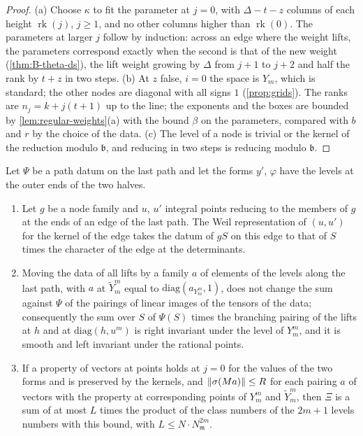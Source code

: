 \begin{proof}
(a) Choose $\kappa$ to fit the parameter at $j=0$, with $\Delta-t-z$ columns of each height $\operatorname{rk}(j)$, $j\ge1$, and no other columns higher than $\operatorname{rk}(0)$. The parameters at larger $j$ follow by induction: across an edge where
the weight lifts, the parameters correspond exactly when the second is that of the new weight (\cref{thm:B-theta-ds}), the lift weight growing by $\Delta$ from $j+1$ to $j+2$ and half the rank by $t+z$ in two steps. (b) At $z$ false,
$i=0$ the space is $Y_m$, which is standard; the other nodes are diagonal with all signs $1$ (\cref{prop:grids}). The ranks are $n_j=k+j(t+1)$ up to the line; the exponents and the boxes are bounded by \cref{lem:regular-weights}(a) with
the bound $\beta$ on the parameters, compared with $b$ and $r$ by the choice of the data. (c) The level of a node is trivial or the kernel of the reduction modulo $\mathfrak b$, and reducing in two steps is reducing modulo $\mathfrak b$.
\end{proof}

\begin{lemma}\label{lem:last-classes}
Let $\Psi$ be a path datum on the last path and let the forms $y'$, $\varphi$ have the levels at the outer ends of the two halves.
\begin{enumerate}[label=\textup{(\alph*)}]
\item Let $g$ be a node family and $u$, $u'$ integral points reducing to the members of $g$ at the ends of an edge of the last path. The Weil representation of $(u,u')$ for the kernel of the edge takes the datum of $gS$ on this edge to that of $S$
times the character of the edge at the determinants.
\item Moving the data of all lifts by a family $a$ of elements of the levels along the last path, with $a$ at $\tilde Y^m_m$ equal to $\mathrm{diag}(a_{Y^m_m},1)$, does not change the sum against $\Psi$ of the pairings of linear images of the
tensors of the data; consequently the sum over $S$ of $\Psi(S)$ times the branching pairing of the lifts at $h$ and at $\mathrm{diag}(h,u^m)$ is right invariant under the level of $Y^m_m$, and it is smooth and left invariant under the rational
points.
\item If a property of vectors at points holds at $j=0$ for the values of the two forms and is preserved by the kernels, and $\lVert \sigma(Ma)\rVert\le R$ for each pairing $a$ of vectors with the property at corresponding points of $Y^m_m$ and
$\tilde Y^m_m$, then $\Xi$ is a sum of at most $L$ times the product of the class numbers of the $2m+1$ levels numbers with this bound, with $L\le N\cdot N_{\mathfrak m}^{2m}$.
\end{enumerate}
\end{lemma}

